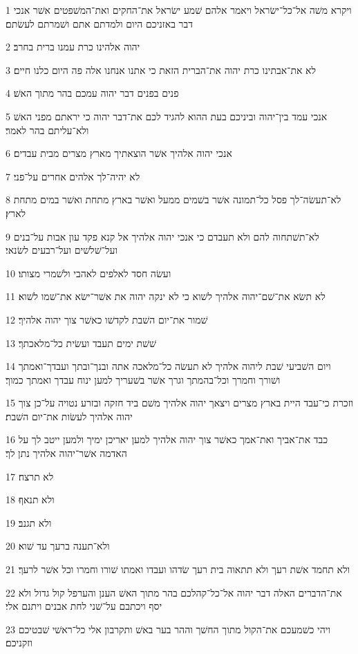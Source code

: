 \par 1 ויקרא משׁה אל־כל־ישׂראל ויאמר אלהם שׁמע ישׂראל את־החקים ואת־המשׁפטים אשׁר אנכי דבר באזניכם היום ולמדתם אתם ושׁמרתם לעשׂתם׃
\par 2 יהוה אלהינו כרת עמנו ברית בחרב׃
\par 3 לא את־אבתינו כרת יהוה את־הברית הזאת כי אתנו אנחנו אלה פה היום כלנו חיים׃
\par 4 פנים בפנים דבר יהוה עמכם בהר מתוך האשׁ׃
\par 5 אנכי עמד בין־יהוה וביניכם בעת ההוא להגיד לכם את־דבר יהוה כי יראתם מפני האשׁ ולא־עליתם בהר לאמר׃
\par 6 אנכי יהוה אלהיך אשׁר הוצאתיך מארץ מצרים מבית עבדים׃
\par 7 לא יהיה־לך אלהים אחרים על־פני׃
\par 8 לא־תעשׂה־לך פסל כל־תמונה אשׁר בשׁמים ממעל ואשׁר בארץ מתחת ואשׁר במים מתחת לארץ׃
\par 9 לא־תשׁתחוה להם ולא תעבדם כי אנכי יהוה אלהיך אל קנא פקד עון אבות על־בנים ועל־שׁלשׁים ועל־רבעים לשׂנאי׃
\par 10 ועשׂה חסד לאלפים לאהבי ולשׁמרי מצותו׃
\par 11 לא תשׂא את־שׁם־יהוה אלהיך לשׁוא כי לא ינקה יהוה את אשׁר־ישׂא את־שׁמו לשׁוא׃
\par 12 שׁמור את־יום השׁבת לקדשׁו כאשׁר צוך יהוה אלהיך׃
\par 13 שׁשׁת ימים תעבד ועשׂית כל־מלאכתך׃
\par 14 ויום השׁביעי שׁבת ליהוה אלהיך לא תעשׂה כל־מלאכה אתה ובנך־ובתך ועבדך־ואמתך ושׁורך וחמרך וכל־בהמתך וגרך אשׁר בשׁעריך למען ינוח עבדך ואמתך כמוך׃
\par 15 וזכרת כי־עבד היית בארץ מצרים ויצאך יהוה אלהיך משׁם ביד חזקה ובזרע נטויה על־כן צוך יהוה אלהיך לעשׂות את־יום השׁבת׃
\par 16 כבד את־אביך ואת־אמך כאשׁר צוך יהוה אלהיך למען יאריכן ימיך ולמען ייטב לך על האדמה אשׁר־יהוה אלהיך נתן לך׃
\par 17 לא תרצח׃
\par 18 ולא תנאף׃
\par 19 ולא תגנב׃
\par 20 ולא־תענה ברעך עד שׁוא׃
\par 21 ולא תחמד אשׁת רעך ולא תתאוה בית רעך שׂדהו ועבדו ואמתו שׁורו וחמרו וכל אשׁר לרעך׃
\par 22 את־הדברים האלה דבר יהוה אל־כל־קהלכם בהר מתוך האשׁ הענן והערפל קול גדול ולא יסף ויכתבם על־שׁני לחת אבנים ויתנם אלי׃
\par 23 ויהי כשׁמעכם את־הקול מתוך החשׁך וההר בער באשׁ ותקרבון אלי כל־ראשׁי שׁבטיכם וזקניכם׃
